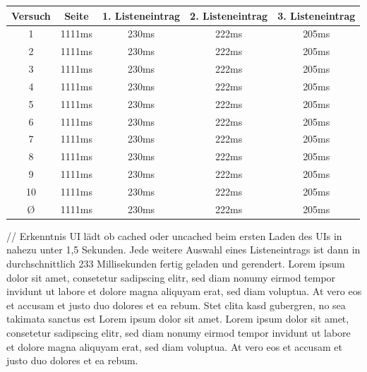 \vspace{1em}
\begin{center}
  \begin{tabular}{ | c | c | c | c | c | }
    \hline
    \textbf{Versuch}
    & \textbf{Seite} & \textbf{1. Listeneintrag} & \textbf{2. Listeneintrag} & \textbf{3. Listeneintrag}\\
    \hline \hline
    1 & 1111ms & 230ms & 222ms & 205ms\\
    \hline
    2 & 1111ms & 230ms & 222ms & 205ms\\
    \hline
    3 & 1111ms & 230ms & 222ms & 205ms\\
    \hline
    4 & 1111ms & 230ms & 222ms & 205ms\\
    \hline
    5 & 1111ms & 230ms & 222ms & 205ms\\
    \hline
    6 & 1111ms & 230ms & 222ms & 205ms\\
    \hline
    7 & 1111ms & 230ms & 222ms & 205ms\\
    \hline
    8 & 1111ms & 230ms & 222ms & 205ms\\
    \hline
    9 & 1111ms & 230ms & 222ms & 205ms\\
    \hline
    10 & 1111ms & 230ms & 222ms & 205ms\\
    \hline \hline
    \O & 1111ms & 230ms & 222ms & 205ms\\
    \hline
  \end{tabular}
\label{tab:uiloading}
\end{center}

// Erkenntnis UI lädt ob cached oder uncached beim ersten Laden des UIs in nahezu unter 1,5 Sekunden. Jede weitere Auswahl eines Listeneintrags ist dann in durchschnittlich 233 Millisekunden fertig geladen und gerendert.
Lorem ipsum dolor sit amet, consetetur sadipscing elitr, sed diam nonumy eirmod tempor invidunt ut labore et dolore magna aliquyam erat, sed diam voluptua. At vero eos et accusam et justo duo dolores et ea rebum. Stet clita kasd gubergren, no sea takimata sanctus est Lorem ipsum dolor sit amet. Lorem ipsum dolor sit amet, consetetur sadipscing elitr, sed diam nonumy eirmod tempor invidunt ut labore et dolore magna aliquyam erat, sed diam voluptua. At vero eos et accusam et justo duo dolores et ea rebum.
